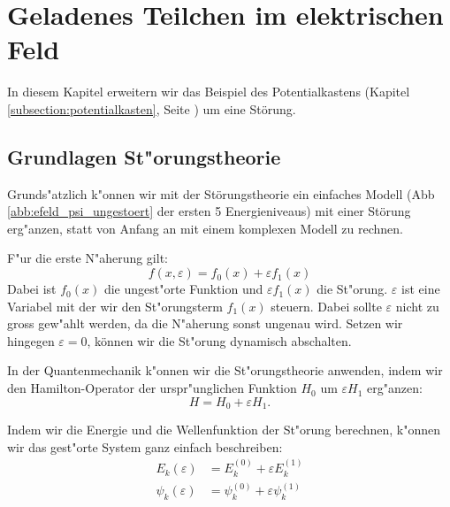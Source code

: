 \chapter{Geladenes Teilchen im elektrischen Feld\label{chapter:efeld}}
\begin{refsection}



In diesem Kapitel erweitern wir das Beispiel des Potentialkastens 
(Kapitel \ref{subsection:potentialkasten}, Seite \pageref{subsection:potentialkasten})
um eine St\"orung.

\section{Grundlagen St"orungstheorie}
Grunds"atzlich k"onnen wir mit der St\"orungstheorie ein einfaches Modell 
(Abb \ref{abb:efeld_psi_ungestoert} der ersten 5 Energieniveaus) 
mit einer St\"orung erg"anzen, statt von Anfang an mit einem komplexen Modell zu rechnen.

F"ur die erste N"aherung gilt:
\[
  f(x, \varepsilon) = f_0(x) + \varepsilon f_1(x)
\]
Dabei ist $f_0(x)$ die ungest"orte Funktion und $\varepsilon f_1(x)$ die St"orung.
$\varepsilon$ ist eine Variabel mit der wir den St"orungsterm $f_1(x)$ steuern.
Dabei sollte $\varepsilon$ nicht zu gross gew"ahlt werden,
da die N"aherung sonst ungenau wird.
Setzen wir hingegen $\varepsilon = 0$, k\"onnen wir die St"orung dynamisch abschalten.




In der Quantenmechanik k"onnen wir die St"orungstheorie anwenden,
indem wir den Hamilton-Operator der urspr"unglichen Funktion $H_0$
um $\varepsilon H_1$ erg"anzen:
\[
  H = H_0 + \varepsilon H_1.
\]

Indem wir die Energie und die Wellenfunktion der St"orung berechnen, k"onnen wir das gest"orte System ganz einfach beschreiben:
\begin{equation}
\begin{aligned}
E_k(\varepsilon)&=E_k^{(0)} + \varepsilon E_k^{(1)}
\\
\psi_k(\varepsilon)&=\psi_k^{(0)} + \varepsilon \psi_k^{(1)}
\end{aligned}
\end{equation}


\end{refsection}
